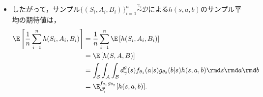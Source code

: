 \documentclass[a4paper,10pt,dvipdfmx]{jsarticle}
\begin{document}
\begin{itemize}
\begin{itemize}
\begin{itemize}
\begin{align}
            \end{align}
            \item したがって，サンプル$\{(S_i,A_i,B_i)\}_{i=1}^n\overset{\gamma_2}{\sim}\mathcal{D}$による$h(s,a,b)$のサンプル平均の期待値は，
            \begin{subequations}
            \begin{align}
                \E\left[\dfrac{1}{n}\sum_{i=1}^nh(S_i,A_i,B_i)\right]&=\dfrac{1}{n}\sum_{i=1}^n\E\left[h(S_i,A_i,B_i)\right]\\
                &=\E\left[h(S,A,B)\right]\\
                &=\int_{\mathcal{S}}\int_{\mathcal{A}}\int_{\mathcal{B}}d_{\gamma}^{\theta}(s)f_{\theta_1}(a|s)g_{\theta_2}(b|s)h(s,a,b)\rmd s\rmd a\rmd b\\
                &=\E_{d_{\gamma}^{\theta}}^{f_{\theta_1}g_{\theta_2}}[h(s,a,b)].
            \end{align}
            \end{subequations}
        \end{itemize} 
    \end{itemize}

\end{itemize}
\end{document}
